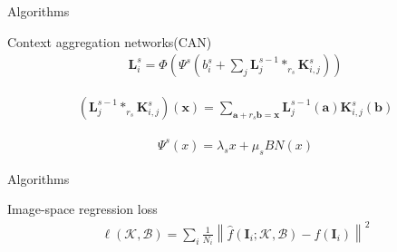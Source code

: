 \documentclass[notes]{beamer}
\begin{document}
\begin{frame}{Algorithms}
	\begin{block}{ Context aggregation networks(CAN)}
		\begin{equation}
			\begin{split}
				\mathbf { L } _ { i } ^ { s } = \Phi \left( \Psi ^ { s } \left( b _ { i } ^ { s } + \sum _ { j } \mathbf { L } _ { j } ^ { s - 1 } * _ { r _ { s } } \mathbf { K } _ { i , j } ^ { s } \right) \right)
			\end{split}
		\end{equation}

		\begin{equation}
			\begin{split}
				\left( \mathbf { L } _ { j } ^ { s - 1 } * _ { r _ { s } } \mathbf { K } _ { i , j } ^ { s } \right) ( \mathbf { x } ) = \sum _ { \mathbf { a } + r _ { s } \mathbf { b } = \mathbf { x } } \mathbf { L } _ { j } ^ { s - 1 } ( \mathbf { a } ) \mathbf { K } _ { i , j } ^ { s } ( \mathbf { b } )
			\end{split}
		\end{equation}

		\begin{equation}
			\begin{split}
				\Psi ^ { s } ( x ) = \lambda _ { s } x + \mu _ { s } B N ( x )
			\end{split}
		\end{equation}

	\end{block}
\end{frame}

\begin{frame}{Algorithms}
	\begin{block}{ Image-space regression loss}
		\begin{equation}
			\begin{split}
				\ell ( \mathcal { K } , \mathcal { B } ) = \sum _ { i } \frac { 1 } { N _ { i } } \left\| \hat { f } \left( \mathbf { I } _ { i } ; \mathcal { K } , \mathcal { B } \right) - f \left( \mathbf { I } _ { i } \right) \right\| ^ { 2 }
			\end{split}
		\end{equation}
	\end{block}
\end{frame}
\end{document}
